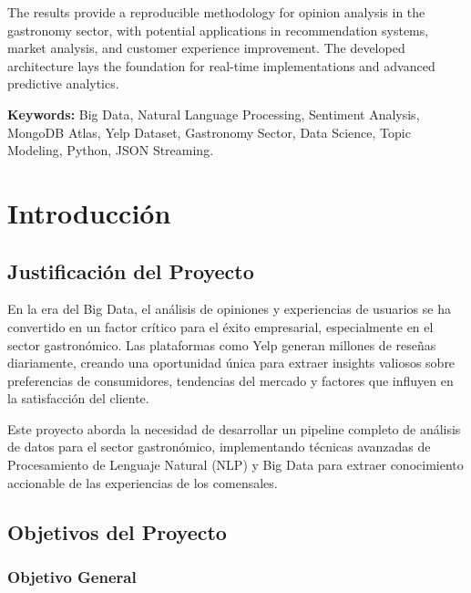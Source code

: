 \documentclass[12pt,a4paper,twoside,openany]{book}
\begin{document}
The results provide a reproducible methodology for opinion analysis in the gastronomy sector, with potential applications in recommendation systems, market analysis, and customer experience improvement. The developed architecture lays the foundation for real-time implementations and advanced predictive analytics.

\vspace{1cm}

\textbf{Keywords:} Big Data, Natural Language Processing, Sentiment Analysis, MongoDB Atlas, Yelp Dataset, Gastronomy Sector, Data Science, Topic Modeling, Python, JSON Streaming.



\pagestyle{mainmatter}

\chapter{Introducción}

\section{Justificación del Proyecto}

En la era del Big Data, el análisis de opiniones y experiencias de usuarios se ha convertido en un factor crítico para el éxito empresarial, especialmente en el sector gastronómico. Las plataformas como Yelp generan millones de reseñas diariamente, creando una oportunidad única para extraer insights valiosos sobre preferencias de consumidores, tendencias del mercado y factores que influyen en la satisfacción del cliente.

Este proyecto aborda la necesidad de desarrollar un pipeline completo de análisis de datos para el sector gastronómico, implementando técnicas avanzadas de Procesamiento de Lenguaje Natural (NLP) y Big Data para extraer conocimiento accionable de las experiencias de los comensales.

\section{Objetivos del Proyecto}

\subsection{Objetivo General}
\end{document}
